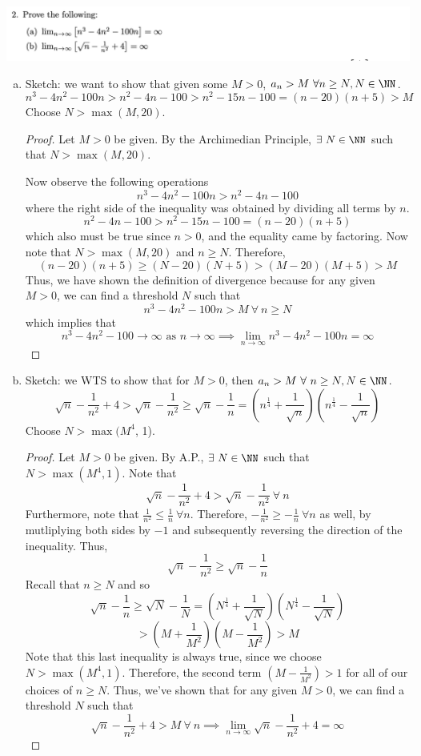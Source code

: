 \documentclass[12pt]{scrartcl}
\begin{document}
\newpage

\includegraphics[width=15cm]{2.png}

\begin{enumerate}[a.]
  \item Sketch: we want to show that given some $M > 0$, $a_n > M \ \forall n \geq N, N \in \NN$.
  \[n^3 - 4n^2 - 100n > n^2 - 4n - 100 > n^2 - 15n - 100 = (n-20)(n+5) > M\]
  Choose $N > \max(M, 20)$.
  
  \begin{proof}
    Let $M > 0$ be given. By the Archimedian Principle, $\exists \ N \in \NN$ such that $N > \max(M, 20)$.
    
    Now observe the following operations 
    \[n^3 - 4n^2 - 100n > n^2 - 4n - 100\]
    where the right side of the inequality was obtained by dividing all terms by $n$. 
    \[n^2 - 4n - 100 > n^2 - 15n - 100 = (n-20)(n+5)\]
    which also must be true since $n > 0$, and the equality came by factoring. Now note that 
    $N > \max(M, 20)$ and $n \geq N$. Therefore, 
    \[(n-20)(n + 5) \geq (N-20)(N+5) > (M-20)(M + 5) > M\] 
    Thus, we have shown the definition of divergence because for any given $M > 0$, we can find a threshold $N$ such that
    \[n^3 - 4n^2 - 100n > M \ \forall \ n \geq N\]
    which implies that
    \[n^3 - 4n^2 - 100 \to \infty \text{ as } n \to \infty \implies \underset{n\to\infty}{\lim}n^3 - 4n^2 - 100n = \infty\]
  \end{proof}

  \item Sketch: we WTS to show that for $M > 0$, then $a_n > M \ \forall \ n \geq N, N \in \NN$.
  \[\sqrt{n} - \frac{1}{n^2} + 4 > \sqrt{n} - \frac{1}{n^2} \geq \sqrt{n} - \frac{1}{n} = (n^{\frac{1}{4}} + \frac{1}{\sqrt{n}})(n^{\frac{1}{4}} - \frac{1}{\sqrt{n}})\]
  Choose $N > \max(M^4$, 1).

  \begin{proof}
    Let $M > 0$ be given. By A.P., $\exists \ N \in \NN$ such that $N > \max(M^4, 1)$.
    Note that
    \[\sqrt{n} - \frac{1}{n^2} + 4 > \sqrt{n} - \frac{1}{n^2} \ \forall \ n\]
    Furthermore, note that $\frac{1}{n^2} \leq \frac{1}{n} \ \forall n$. Therefore, 
    $-\frac{1}{n^2} \geq -\frac{1}{n} \ \forall n$ as well, by mutliplying both sides by $-1$ 
    and subsequently reversing the direction of the inequality. Thus, 
    \[\sqrt{n} - \frac{1}{n^2} \geq \sqrt{n} - \frac{1}{n}\]
    Recall that $n \geq N$ and so 
    \[\sqrt{n} - \frac{1}{n} \geq \sqrt{N} - \frac{1}{N} = (N^{\frac{1}{4}} + \frac{1}{\sqrt{N}})(N^{\frac{1}{4}} - \frac{1}{\sqrt{N}})\]
    \[> (M + \frac{1}{M^2})(M - \frac{1}{M^2}) > M\]
    Note that this last inequality is always true, since we choose $N > \max(M^4, 1)$. Therefore, 
    the second term $(M - \frac{1}{M^2}) > 1$ for all of our choices of $n \geq N$. Thus, we've shown that 
    for any given $M > 0$, we can find a threshold $N$ such that 
    \[\sqrt{n} - \frac{1}{n^2} + 4 > M \ \forall \ n \implies \lim_{n\to\infty}\sqrt{n} - \frac{1}{n^2} + 4 = \infty\]
  

\end{proof}
\end{enumerate}
\end{document}

